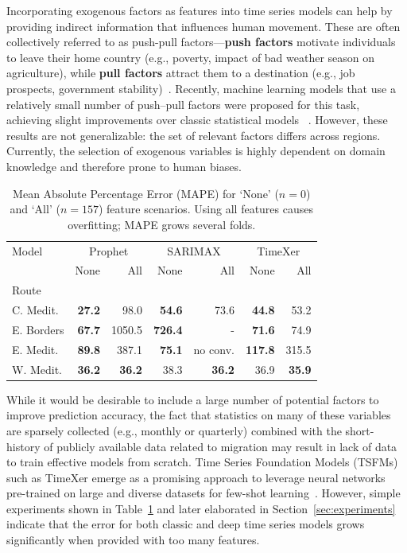 \documentclass[conference]{IEEEtran}
\begin{document}
Incorporating exogenous factors as features into time series models can help by providing indirect information that influences human movement. These are often collectively referred to as push-pull factors---\textbf{push factors} motivate individuals to leave their home country (e.g., poverty, impact of bad weather season on agriculture), while \textbf{pull factors} attract them to a destination (e.g., job prospects, government stability)~\cite{lee1966theory}. %
Recently, machine learning models that use a relatively small number of push--pull factors were proposed for this task, achieving slight improvements over classic statistical models ~\cite{abel2013forecasting,  azizi2020artificial, fantazzini2021forecasting,  Carammia2022, qi2023modelling}. However, these results are not generalizable: the set of relevant factors differs across regions. Currently, the selection of exogenous variables is highly dependent on domain knowledge and therefore prone to human biases.

\begin{table}[t!]
\caption{Mean Absolute Percentage Error (MAPE) for `None' ($n=0$) and `All' ($n=157$) feature scenarios. Using all features causes overfitting; MAPE grows several folds.}
\label{tab:baseline_mape}
\begin{tabular}{lrrrrrr}
\toprule
Model & \multicolumn{2}{c}{Prophet} & \multicolumn{2}{c}{SARIMAX} & \multicolumn{2}{c}{TimeXer} \\
 & None & All & None & All & None & All \\
Route &  &  &  &  &  &  \\
\midrule
C. Medit. & \textbf{27.2} & 98.0 & \textbf{54.6} & 73.6 & \textbf{44.8} & 53.2 \\
E. Borders & \textbf{67.7} & 1050.5 & \textbf{726.4} & - & \textbf{71.6} & 74.9 \\
E. Medit. & \textbf{89.8} & 387.1 & \textbf{75.1} & no conv. & \textbf{117.8} & 315.5 \\
W. Medit. & \textbf{36.2} & \textbf{36.2} & 38.3 & \textbf{36.2} & 36.9 & \textbf{35.9} \\
\bottomrule
\end{tabular}
\end{table}

While it would be desirable to include a large number of potential factors to improve prediction accuracy, the fact that statistics on many of these variables are sparsely collected (e.g., monthly or quarterly) combined with the short-history of publicly available data related to migration may result in lack of data to train effective models from scratch.
%
Time Series Foundation Models (TSFMs) such as TimeXer emerge as a promising approach to leverage neural networks pre-trained on large and diverse datasets for few-shot learning~\cite{Liang_Wen_Nie_Jiang_Jin_Song_Pan_Wen_2024}. However, simple experiments shown in Table~\ref{tab:baseline_mape} and later elaborated in Section~\ref{sec:experiments} indicate that the error for both classic and deep time series models grows significantly when provided with too many features.
\end{document}
